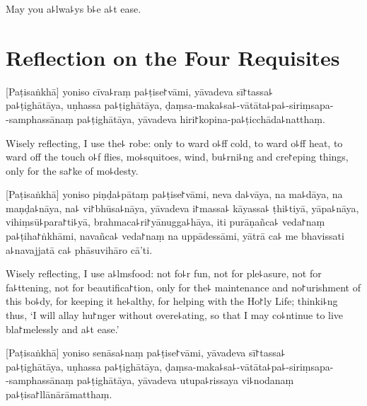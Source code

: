 \begin{english}
  May you a꜕lwa꜕ys b꜕e a꜕t ease.
\end{english}

\chapter[Four Requisites]{Reflection on the Four Requisites}%


\begin{leader}
\end{leader}

[Paṭisaṅkhā] yoniso cīva꜕raṃ pa꜕ṭise꜓vāmi, yāvadeva sī꜓tassa꜕\\
pa꜕ṭighātāya, uṇhassa pa꜕ṭighātāya, ḍaṃsa-maka꜕sa꜕-vātāta꜕pa꜕-siriṃsapa-\\
-samphassānaṃ pa꜕ṭighātāya, yāvadeva hiri꜓kopina-pa꜕ṭicchāda꜕natthaṃ.

\begin{english}
  Wisely reflecting, I use the꜕ robe: only to ward o꜕ff cold, to ward o꜕ff heat, to ward off the touch o꜕f flies, mo꜕squitoes, wind, bu꜕rni꜕ng and cre꜓eping things, only for the sa꜓ke of mo꜕desty.
\end{english}

[Paṭisaṅkhā] yoniso piṇḍa꜕pātaṃ pa꜕ṭise꜓vāmi, neva da꜕vāya, na ma꜕dāya, na maṇḍa꜕nāya, na꜕ vi꜓bhūsa꜕nāya, yāvadeva i꜓massa꜕ kāyassa꜕ ṭhi꜕tiyā, yāpa꜕nāya, vihiṃsū꜕para꜓ti꜕yā, brahmaca꜕ri꜓yānugga꜕hāya, iti purāṇañca꜕ veda꜓naṃ pa꜕ṭiha꜓ṅkhāmi, navañca꜕ veda꜓naṃ na uppādessāmi, yātrā ca꜕ me bhavissati a꜕navajjatā ca꜕ phāsuvihāro cā'ti.

\begin{english}
  Wisely reflecting, I use a꜕lmsfood: not fo꜕r fun, not for ple꜕asure, not for fa꜕ttening, not for beautifica꜓tion, only for the꜕ maintenance and no꜓urishment of this bo꜕dy, for keeping it he꜕althy, for helping with the Ho꜓ly Life; thinki꜕ng thus, `I will allay hu꜓nger without overe꜕ating, so that I may co꜕ntinue to live bla꜓melessly and a꜕t ease.'
\end{english}

[Paṭisaṅkhā] yoniso senāsa꜕naṃ pa꜕ṭise꜓vāmi, yāvadeva sī꜓tassa꜕\\
pa꜕ṭighātāya, uṇhassa pa꜕ṭighātāya, ḍaṃsa-maka꜕sa꜕-vātāta꜕pa꜕-siriṃsapa-\\
-samphassānaṃ pa꜕ṭighātāya, yāvadeva utupa꜕rissaya vi꜕nodanaṃ pa꜕ṭisa꜓llānārāmatthaṃ.

